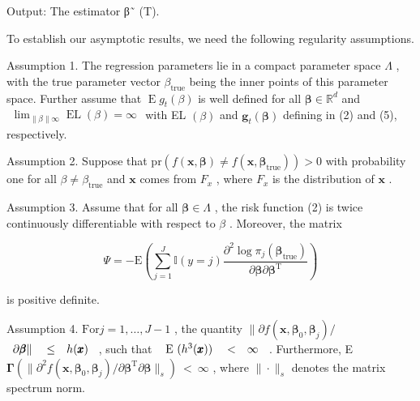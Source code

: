 \documentclass[
  10
]{article}
\begin{document}
Output: The estimator β˜ (T).

To establish our asymptotic results, we need the following regularity
assumptions.

Assumption 1. The regression parameters lie in a compact parameter space
\(\Lambda\) , with the true parameter vector
\(\beta _ { \mathrm { t r u e } }\) being the inner points of this
parameter space. Further assume that
\(\operatorname { E } g _ { t } ( \beta )\) is well defined for all
\(\pmb { \beta } \in \mathbb { R } ^ { d }\) and
\(\begin{array} { r } { \operatorname* { l i m } _ { \| \beta \|  \infty } \operatorname { E L } ( \beta ) = \infty } \end{array}\)
with EL \(( \beta )\) and \({ \pmb g } _ { t } ( { \pmb \beta } )\)
defining in (2) and (5), respectively.

Assumption 2. Suppose that
\(\mathrm { p r } ( f ( \pmb { x } , \pmb { \beta } ) \neq f ( \pmb { x } , \pmb { \beta } _ { \mathrm { t r u e } } ) ) > 0\)
with probability one for all
\(\beta \neq \beta _ { \mathrm { t r u e } }\) and \(\pmb { x }\) comes
from \(F _ { x }\) , where \(F _ { x }\) is the distribution of
\(\pmb { x }\) .

Assumption 3. Assume that for all \(\pmb { \beta } \in \Lambda\) , the
risk function (2) is twice continuously differentiable with respect to
\(\beta\) . Moreover, the matrix

\[
\Psi = - \mathrm { E } \left( \sum _ { j = 1 } ^ { J } \mathbb { I } ( y = j ) \frac { \partial ^ { 2 } \log \pi _ { j } ( \pmb { \beta } _ { \mathrm { t r u e } } ) } { \partial \pmb { \beta } \partial \pmb { \beta } ^ { \operatorname { T } } } \right)
\]

is positive definite.

Assumption 4. \(\mathrm { F o r } j = 1 , \dotsc , J - 1\) , the
quantity
\(\| \partial f ( \pmb { x } , \pmb { \beta } _ { 0 } , \pmb { \beta } _ { j } ) /\)
\(\begin{array} { r l r } { \partial \pmb { \beta } \| } & { { } \le } & { h ( \pmb { x } ) } \end{array}\)
, such that
\(\begin{array} { r l r } { \mathrm { ~ E ~ } ( h ^ { 3 } ( { \pmb x } ) ) } & { { } < } & { \infty } \end{array}\)
. Furthermore, E
\(\mathbf { \Gamma } ( \| \partial ^ { 2 } f ( \pmb { x } , \pmb { \beta } _ { 0 } , \pmb { \beta } _ { j } ) / \partial \pmb { \beta } ^ { \mathrm { T } } \partial \pmb { \beta } \| _ { s } ) \ < \ \infty\)
, where \(\| \cdot \| _ { s }\) denotes the matrix spectrum norm.
\end{document}
